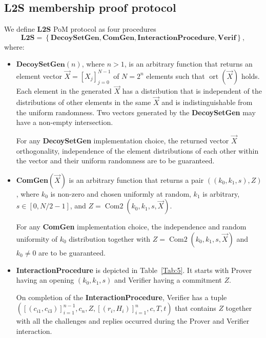 \documentclass{mathcryptology} %
\DeclareMathOperator{\ort}{ort}
\DeclareMathOperator{\ComTwo}{Com2}
\theoremstyle{title}
\theoremstyle{titleof}
\begin{document}
\subsection{L2S membership proof protocol}
    We define \textbf{L2S} PoM protocol as four procedures
    \begin{equation*}
    \textbf{L2S} = \left\{\textbf{DecoySetGen}, \textbf{ComGen}, \textbf{InteractionProcedure}, \textbf{Verif}\right\},
    \end{equation*}
    where:
    \begin{itemize}
        \item $\textbf{DecoySetGen}\left(n\right)$, where $n>1$, is an arbitrary function that returns an element vector $\vec{X}= {\left[X_{j}\right]}_{j=0}^{N-1}$ of $N=2^{n}$ elements such that $\ort\left(\vec{X}\right)$ holds. Each element in the generated $\vec{X}$ has a distribution that is independent of the distributions of other elements in the same $\vec{X}$ and is indistinguishable from the uniform randomness. Two vectors generated by the \textbf{DecoySetGen} may have a non-empty intersection.

        For any \textbf{DecoySetGen} implementation choice, the returned vector $\vec{X}$ orthogonality, independence of the element distributions of each other within the vector and their uniform randomness are to be guaranteed.

        \item \textbf{ComGen}$\left(\vec{X}\right)$ is an arbitrary function that returns a pair $\left(\left(k_{0}, k_{1}, s\right), Z\right)$, where $k_{0}$ is non-zero and chosen uniformly at random, $k_{1}$ is arbitrary, $s\in\left[0,N/2-1\right]$, and $Z=\ComTwo\left(k_{0}, k_{1}, s, \vec{X}\right)$. 
        
        For any \textbf{ComGen} implementation choice, the independence and random uniformity of $k_{0}$ distribution together with $Z=\ComTwo\left(k_{0}, k_{1}, s, \vec{X}\right)$ and $k_{0}\neq0$ are to be guaranteed.

        \item \textbf{InteractionProcedure} is depicted in Table~\ref{Tab:5}. It starts with Prover having an opening $\left(k_{0}, k_{1}, s\right)$ and Verifier having a commitment $Z$.

        On completion of the \textbf{InteractionProcedure}, Verifier has a tuple $\left({\left[\left(c_{i1}, c_{i3}\right)\right]}_{i=1}^{n-1},c_{n},Z,{\left[\left(r_{i}, H_{i}\right)\right]}_{i=1}^n,c,T,t\right)$ that contains $Z$ together with all the challenges and replies occurred during the Prover and Verifier interaction.
        \end{itemize}
\end{document}
